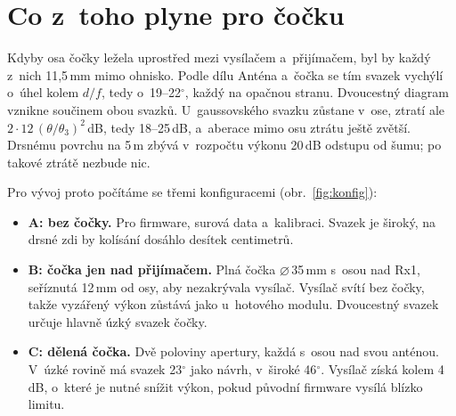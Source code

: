 \documentclass[czech]{skyren}
\begin{document}
\section{Co z~toho plyne pro čočku}

Kdyby osa čočky ležela uprostřed mezi vysílačem a~přijímačem, byl by každý
z~nich 11,5\,mm mimo ohnisko. Podle dílu Anténa a~čočka se tím svazek
vychýlí o~úhel kolem $d/f$, tedy o~19--22$^\circ$, každý na opačnou stranu.
Dvoucestný diagram vznikne součinem obou svazků. U~gaussovského svazku
zůstane v~ose, ztratí ale $2 \cdot 12\,(\theta/\theta_3)^2$\,dB, tedy
18--25\,dB, a~aberace mimo osu ztrátu ještě zvětší. Drsnému povrchu na 5\,m
zbývá v~rozpočtu výkonu 20\,dB odstupu od šumu; po takové ztrátě nezbude nic.

Pro vývoj proto počítáme se třemi konfiguracemi (obr.~\ref{fig:konfig}):

\begin{itemize}
\item \textbf{A: bez čočky.} Pro firmware, surová data a~kalibraci. Svazek
  je široký, na drsné zdi by kolísání dosáhlo desítek centimetrů.
\item \textbf{B: čočka jen nad přijímačem.} Plná čočka $\varnothing$\,35\,mm
  s~osou nad Rx1, seříznutá 12\,mm od osy, aby nezakrývala vysílač. Vysílač
  svítí bez čočky, takže vyzářený výkon zůstává jako u~hotového modulu.
  Dvoucestný svazek určuje hlavně úzký svazek čočky.
\item \textbf{C: dělená čočka.} Dvě poloviny apertury, každá s~osou nad svou
  anténou. V~úzké rovině má svazek 23$^\circ$ jako návrh, v~široké
  46$^\circ$. Vysílač získá kolem 4\,dB, o~které je nutné snížit výkon,
  pokud původní firmware vysílá blízko limitu.
\end{itemize}
\end{document}
